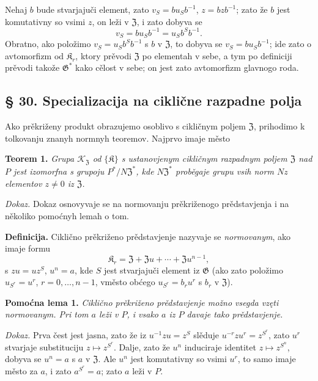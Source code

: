 \documentclass[11pt]{article}
\begin{document}
Nehaj \(b\) bude stvarjajuči element, zato \(v_S=bu_Sb^{-1}\), \(z=bzb^{-1}\); zato že \(b\) jest komutativny so vsimi \(z\), on leži v \(\mathfrak Z\), i zato dobyva se
\[
v_S=bu_Sb^{-1}=u_Sb^Sb^{-1}.
\]
Obratno, ako položimo \(v_S=u_Sb^Sb^{-1}\) s \(b\) v \(\mathfrak Z\), to dobyva se \(v_S=bu_Sb^{-1}\); ide zato o avtomorfizm od \(\mathfrak K_r\), ktory prěvodi \(\mathfrak Z\) po elementah v sebe, a tym po definiciji prěvodi takože \(\mathfrak G^*\) kako cělost v sebe; on jest zato avtomorfizm glavnogo roda.

\subsection*{§ 30. Specializacija na ciklične razpadne polja}\label{spezialisierung-auf-zyklische-zerfaellungskoerper}

Ako prěkriženy produkt obrazujemo osoblivo s cikličnym poljem \(\mathfrak Z\), prihodimo k tolkovanju znanyh normnyh teoremov. Najprvo imaje město

\noindent\textbf{Teorem 1.} \emph{Grupa \(\mathscr K_{\mathfrak Z}\) od \(\{\mathfrak K\}\) s ustanovjenym cikličnym razpadnym poljem \(\mathfrak Z\) nad \(P\) jest izomorfna s grupoju \(P^*/N\mathfrak Z^*\), kde \(N\mathfrak Z^*\) proběgaje grupu vsih norm \(Nz\) elementov \(z\neq0\) iz \(\mathfrak Z\).}

\noindent\emph{Dokaz.} Dokaz osnovyvaje se na normovanju prěkriženogo prědstavjenja i na několiko pomoćnyh lemah o tom.

\noindent\textbf{Definicija.} Ciklično prěkriženo prědstavjenje nazyvaje se \emph{normovanym}, ako imaje formu
\[
\mathfrak K_r=\mathfrak Z+\mathfrak Zu+\cdots+\mathfrak Zu^{n-1},
\]
s \(zu=uz^S\), \(u^n=a\), kde \(S\) jest stvarjajuči element iz \(\mathfrak G\) (ako zato položimo \(u_{S^r}=u^r\), \(r=0,\ldots,n-1\), vměsto obćego \(u_{S^r}=b_ru^r\) s \(b_r\) v \(\mathfrak Z\)).

\noindent\textbf{Pomoćna lema 1.} \emph{Ciklično prěkriženo prědstavjenje možno vsegda vzęti normovanym. Pri tom \(a\) leži v \(P\), i vsako \(a\) iz \(P\) davaje tako prědstavjenje.}

\noindent\emph{Dokaz.} Prva čest jest jasna, zato že iz \(u^{-1}zu=z^S\) slěduje \(u^{-r}zu^r=z^{S^r}\), zato \(u^r\) stvarjaje substituciju \(z\mapsto z^{S^r}\). Dalje, zato že \(u^n\) induciraje identitet \(z\mapsto z^{S^n}\), dobyva se \(u^n=a\) s \(a\) v \(\mathfrak Z\). Ale \(u^n\) jest komutativny so vsimi \(u^r\), to samo imaje město za \(a\), i zato \(a^{S^r}=a\); zato \(a\) leži v \(P\).
\end{document}
